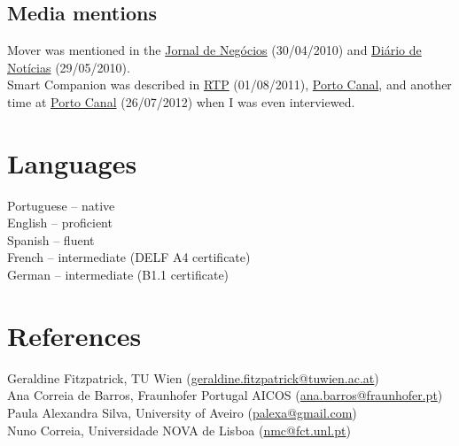 \documentclass[11pt, a4paper]{article} %
\begin{document}
\subsection*{Media mentions}

Mover was mentioned in the \href{http://www.jornaldenegocios.pt/empresas/detalhe/evitar_acidentes_com_idosos_pode_estar_agrave_distacircncia_de_um_telemoacutevel.html}{Jornal de Negócios} (30/04/2010) and \href{http://www.dn.pt/inicio/ciencia/interior.aspx?content_id=1581122&seccao=Tecnologia}{Diário de Notícias} (29/05/2010).\\
Smart Companion was described in \href{https://www.youtube.com/watch?v=nWqpXHaN5Is}{RTP} (01/08/2011), \href{https://www.youtube.com/watch?v=gIa2ZMeJ7MI}{Porto Canal}, and another time at \href{https://www.youtube.com/watch?v=miAXlLm2GSQ}{Porto Canal} (26/07/2012) when I was even interviewed.	

\section*{Languages}

Portuguese -- native\\
English -- proficient\\
Spanish -- fluent\\
French -- intermediate (DELF A4 certificate)\\
German -- intermediate (B1.1 certificate)\\

\section*{References}

Geraldine Fitzpatrick, TU Wien (\href{mailto:geraldine.fitzpatrick@tuwien.ac.at}{geraldine.fitzpatrick@tuwien.ac.at})\\
Ana Correia de Barros, Fraunhofer Portugal AICOS
(\href{mailto:ana.barros@fraunhofer.pt}{ana.barros@fraunhofer.pt})\\
Paula Alexandra Silva, University of Aveiro (\href{mailto:palexa@gmail.com}{palexa@gmail.com})\\
Nuno Correia, Universidade NOVA de Lisboa (\href{mailto:nmc@fct.unl.pt}{nmc@fct.unl.pt})\\
\end{document}
